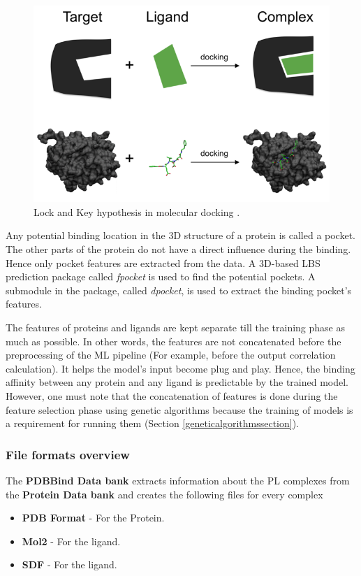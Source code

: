 \documentclass[11pt]{article}
\begin{document}
\begin{figure}[htb]
  \centering
    \includegraphics[scale=0.7]{images/lock_and_key}
    \caption{Lock and Key hypothesis in molecular docking \cite{lockandkeyformatpng}.}
    \label{fig:lockandkey}
\end{figure}

Any potential binding location in the 3D structure of a protein is called a pocket. The other parts of the protein do not have a direct influence during the binding. Hence only pocket features are extracted from the data.
A 3D-based LBS prediction package called \textit{fpocket} is used to find the potential pockets.
A submodule in the package, called \textit{dpocket}, is used to extract the binding pocket's features.

The features of proteins and ligands are kept separate till the training phase as much as possible.
In other words, the features are not concatenated before the preprocessing of the ML pipeline (For example, before the output correlation calculation).
It helps the model's input become plug and play.
Hence, the binding affinity between any protein and any ligand is predictable by the trained model.
However, one must note that the concatenation of features is done during the feature selection phase using genetic algorithms because the training of models is a requirement for running them (Section \ref{geneticalgorithmssection}).



\subsubsection{File formats overview}
The \textbf{PDBBind Data bank} extracts information about the PL complexes from the \textbf{Protein Data bank} and creates the following files for every complex
\begin{itemize}
\item \textbf{PDB Format} - For the Protein.
\item  \textbf{Mol2} - For the ligand.
\item \textbf{SDF} - For the ligand.
\end{itemize}
\end{document}
